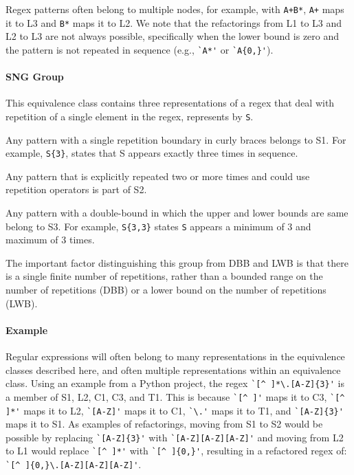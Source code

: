 Regex patterns often belong to multiple nodes, for example, with \verb!A+B*!,  \verb!A+! maps it to L3 and \verb!B*! maps it to L2. We note that the refactorings from L1 to L3 and L2 to L3 are not always possible, specifically when the lower bound is zero and the pattern is not repeated in sequence (e.g., \verb!`A*'! or \verb!`A{0,}'!).

\paragraph{SNG Group} This equivalence class contains  three representations of a regex that  deal with repetition of a single element in the regex, represents by \verb!S!.

\begin{description}  \itemsep -1pt
\item[S1:] Any pattern with a single repetition boundary in curly braces belongs to S1. For example,   \verb!S{3}!, states that S appears exactly three times in sequence.
\item[S2:] Any pattern that is explicitly repeated two or more times and could use repetition operators is part of S2.
\item[S3:] Any pattern with a double-bound in which the upper and lower bounds are same belong to S3. For example, \verb!S{3,3}! states \verb!S! appears a minimum of 3 and maximum of 3 times.
\end{description}

The important factor distinguishing this group from DBB and LWB is that there is a single finite number of repetitions, rather than a bounded range on the number of repetitions (DBB) or a lower bound on the number of repetitions (LWB).

\paragraph{Example}
Regular expressions will often belong to many representations in the equivalence classes described here, and often multiple representations within an equivalence class.
Using an example from a Python project, the regex \verb!`[^ ]*\.[A-Z]{3}'! is a member of S1, L2, C1, C3, and T1. This is because \verb!`[^ ]'! maps it to C3, \verb!`[^ ]*'! maps it to L2, \verb!`[A-Z]'! maps it to C1, \verb!`\.'! maps it to T1, and \verb!`[A-Z]{3}'! maps it to S1.
As examples of refactorings, moving from S1 to S2 would be possible by replacing  \verb!`[A-Z]{3}'! with  \verb!`[A-Z][A-Z][A-Z]'! and moving from L2 to L1 would replace \verb!`[^ ]*'! with \verb!`[^ ]{0,}'!, resulting in a refactored regex of:  \verb!`[^ ]{0,}\.[A-Z][A-Z][A-Z]'!.

